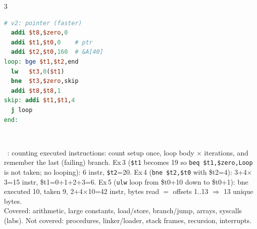 \documentclass[landscape]{article}
\newcommand{\sub}[1]{\par\vspace{1pt}{\color{cur}\bfseries #1}\ }
\newcommand{\tc}[1]{\texttt{#1}}
\begin{document}
\begin{multicols*}{3}
\begin{minipage}[t]{0.48\linewidth}
\begin{lstlisting}[language=mips]
# v2: pointer (faster)
  addi $t8,$zero,0
  addi $t1,$t0,0    # ptr
  addi $t2,$t0,160  # &A[40]
loop: bge $t1,$t2,end
  lw   $t3,0($t1)
  bne  $t3,$zero,skip
  addi $t8,$t8,1
skip: addi $t1,$t1,4
  j loop
end:
\end{lstlisting}
\end{minipage}\\
\sub{Exercises}: counting executed instructions: count setup once, loop body $\times$ iterations, and remember the last (failing) branch. Ex\,3 (\tc{\$t1} becomes 19 so \tc{beq \$t1,\$zero,Loop} is not taken; no looping): 6 instr, \tc{\$t2}=20. Ex\,4 (\tc{bne \$t2,\$t0} with \$t2=4): 3+4$\times$3=15 instr, \$t1=0+1+2+3=6. Ex\,5 (\tc{ulw} loop from \$t0+10 down to \$t0+1): bne executed 10, taken 9, 2+4$\times$10=42 instr, bytes read $=$ offsets 1..13 $\Rightarrow$ 13 unique bytes.\\
Covered: arithmetic, large constants, load/store, branch/jump, arrays, syscalls (labs). Not covered: procedures, linker/loader, stack frames, recursion, interrupts.


\end{multicols*}
\end{document}
